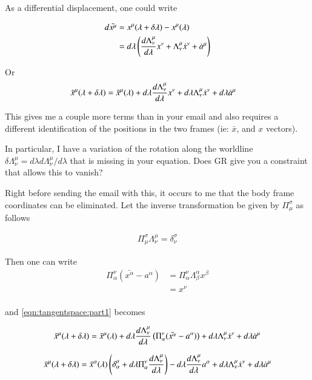 As a differential displacement, one could write

\begin{align*}
d\bar{x^\mu}
&= x^\mu(\lambda + \delta\lambda) - x^\mu(\lambda) \\
&= 
d\lambda \left(
\frac{d \Lambda^\mu_\nu}{d\lambda} x^\nu 
+ \Lambda^\mu_\nu \dot{x}^\nu
+ \dot{a}^\mu
\right)
\end{align*}

Or
\begin{align}\label{eqn:tangentspace:part1}
\bar{x}^\mu(\lambda + \delta\lambda) 
&= \bar{x}^\mu(\lambda)
+ d\lambda \frac{d \Lambda^\mu_\nu}{d\lambda} x^\nu 
+ d\lambda \Lambda^\mu_\nu \dot{x}^\nu
+ d\lambda \dot{a}^\mu
\end{align}

This gives me a couple more terms than in your email
and also requires a different identification of the positions in the two frames (ie: $\bar{x}$, and $x$ vectors).

In particular, I have a variation of the rotation along the worldline $\delta \Lambda^\mu_\nu = d\lambda d\Lambda^\mu_\nu/d\lambda$ that is missing
in your equation.  Does GR give you a constraint that allows this to vanish?

Right before sending the email with this, it occurs to me that the body frame coordinates can be eliminated.  Let the inverse transformation be given by $\Pi^\sigma_\mu$ as follows

\begin{align*}
\Pi^\sigma_\mu \Lambda^\mu_\nu = \delta^\sigma_\nu
\end{align*}

Then one can write
\begin{align*}
\Pi^\nu_\alpha(\bar{x^\alpha} - a^\alpha)
&= \Pi^\nu_\alpha \Lambda^\alpha_\beta x^\beta  \\
&= x^\nu  \\
\end{align*}

and \ref{eqn:tangentspace:part1} becomes

\begin{align*}
\bar{x}^\mu(\lambda + \delta\lambda) 
&= 
\bar{x}^\mu(\lambda)
+ d\lambda \frac{d \Lambda^\mu_\nu}{d\lambda} \left( \Pi^\nu_\alpha(\bar{x^\alpha} - a^\alpha) \right)
+ d\lambda \Lambda^\mu_\nu \dot{x}^\nu
+ d\lambda \dot{a}^\mu \\
\end{align*}

\begin{align}\label{eqn:tangentspace:partII}
\bar{x}^\mu(\lambda + \delta\lambda) 
&= 
\bar{x}^\alpha(\lambda) \left( \delta^\mu_\alpha + d\lambda \Pi^\nu_\alpha \frac{d \Lambda^\mu_\nu}{d\lambda} \right)
- d\lambda \frac{d \Lambda^\mu_\nu}{d\lambda} a^\alpha
+ d\lambda \Lambda^\mu_\nu \dot{x}^\nu
+ d\lambda \dot{a}^\mu \\
\end{align}

